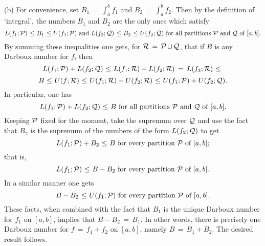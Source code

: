         (b) For convenience, set ${\displaystyle B_{1} \,=\, \int_{a}^{b} f_{1}}$ and ${\displaystyle B_{2} \,=\, \int_{a}^{b} f_{2}}$.
    Then by the definition of `integral', the numbers $B_{1}$ and $B_{2}$ are the only ones which satisfy
        \begin{displaymath}
        L(f_{1};{\cal P})\,\,{\leq}\,\,B_{1}\,\,{\leq}\,\,U(f_{1};{\cal P})
        \mbox{ and }
        L(f_{2};{\cal Q})\,\,{\leq}\,\,B_{2}\,\,{\leq}\,\,U(f_{2};{\cal Q})
        \mbox{ for all partitions ${\cal P}$ and ${\cal Q}$ of $[a,b]$}.
        \end{displaymath}
    By summing these inequalities one gets, for ${\cal R} \,=\, {\cal P}\,{\cup}\,{\cal Q}$,
    that if $B$ is any Darboux number for $f$, then
        \begin{displaymath}
        L(f_{1};{\cal P}) + L(f_{2};{\cal Q})\,\,{\leq}\,\,L(f_{1};{\cal R}) + L(f_{2};{\cal R}) \,=\, L(f_{3};{\cal R})
    \,\,{\leq}\,\,
        \end{displaymath}
        \begin{displaymath}
        B\,\,{\leq}\,\,
        U(f;{\cal R})\,\,{\leq}\,\,U(f_{1};{\cal R}) + U(f_{2};{\cal R})
        \,\,{\leq}\,\,
        U(f_{1}; {\cal P}) + U(f_{2};{\cal Q}).
        \end{displaymath}
    In particular, one has
        \begin{displaymath}
        L(f_{1};{\cal P}) + L(f_{2};{\cal Q})\,\,{\leq}\,\,B \mbox{ for all partitions ${\cal P}$ and ${\cal Q}$ of $[a,b]$}.
        \end{displaymath}
    Keeping ${\cal P}$ fixed for the moment, take the supremum over ${\cal Q}$ and use the fact that
    $B_{2}$ is the supremum of the numbers of the form $L(f_{2};{\cal Q})$ to get
        \begin{displaymath}
        L(f_{1};{\cal P}) + B_{2}\,\,{\leq}\,\,B \mbox{ for every partition ${\cal P}$ of $[a,b]$};
        \end{displaymath}
    that is,
        \begin{displaymath}
        L(f_{1};{\cal P})\,\,{\leq}\,\,B - B_{2} \mbox{ for every partition ${\cal P}$ of $[a,b]$}.
        \end{displaymath}
    In a similar manner one gets
        \begin{displaymath}
        B-B_{2}\,\,{\leq}\,\, U(f_{1};{\cal P})\mbox{ for every partition ${\cal P}$ of $[a,b]$}.
        \end{displaymath}
    These facts, when combined with the fact that $B_{1}$ is the unique Darboux number for $f_{1}$ on $[a,b]$, implies that $B-B_{2} \,=\, B_{1}$.
    In other words, there is precisely one Darboux number for $f \,=\, f_{1}+f_{2}$ on $[a,b]$, namely $B \,=\, B_{1}+B_{2}$. The desired result follows.

